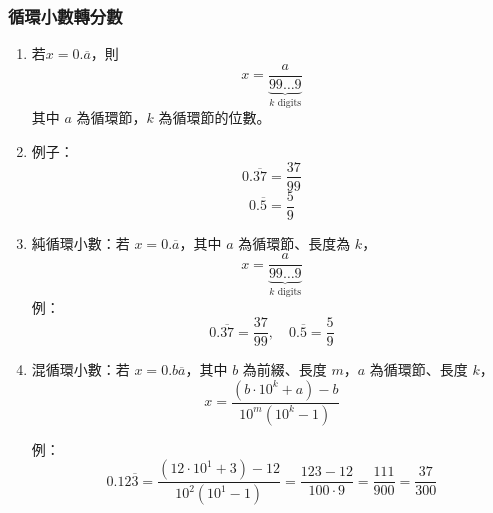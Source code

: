 \subsubsection{循環小數轉分數}
\begin{enumerate}\itemsep = -3pt
\item 若$x=0.\overline{a}$，則
\[
x = \frac{a}{\underbrace{99\ldots9}_{k \text{ digits}}}
\]
其中 $a$ 為循環節，$k$ 為循環節的位數。
\item 例子：
\[
0.\overline{37} = \frac{37}{99}
\]
\[
0.\overline{5} = \frac{5}{9}
\]
\item 純循環小數：若 $x = 0.\overline{a}$，其中 $a$ 為循環節、長度為 $k$，
\[
x = \frac{a}{\underbrace{99\ldots9}_{k \text{ digits}}}
\]
例：
\[
0.\overline{37} = \frac{37}{99}, \quad 0.\overline{5} = \frac{5}{9}
\]

\item 混循環小數：若 $x = 0.b\overline{a}$，其中 $b$ 為前綴、長度 $m$，$a$ 為循環節、長度 $k$，
\[
x = \frac{(b \cdot 10^k + a) - b}{10^m(10^k-1)}
\]

例：
\[
0.12\overline{3} 
= \frac{(12 \cdot 10^1 + 3) - 12}{10^2(10^1-1)}
= \frac{123 - 12}{100 \cdot 9}
= \frac{111}{900}
= \frac{37}{300}
\]
\end{enumerate}


